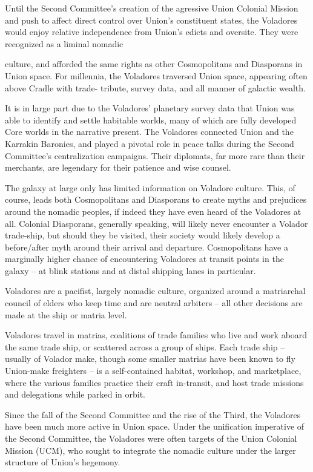 Until the Second Committee’s creation of the agressive Union Colonial Mission and push to
affect direct control over Union’s constituent states, the Voladores would enjoy relative
independence from Union’s edicts and oversite. They were recognized as a liminal nomadic




culture, and afforded the same rights as other Cosmopolitans and Diasporans in Union space.
For millennia, the Voladores traversed Union space, appearing often above Cradle with trade-
tribute, survey data, and all manner of galactic wealth.


It is in large part due to the Voladores’ planetary survey data that Union was able to identify and
settle habitable worlds, many of which are fully developed Core worlds in the narrative present.
The Voladores connected Union and the Karrakin Baronies, and played a pivotal role in peace
talks during the Second Committee’s centralization campaigns. Their diplomats, far more rare
than their merchants, are legendary for their patience and wise counsel.


The galaxy at large only has limited information on Voladore culture. This, of course, leads both
Cosmopolitans and Diasporans to create myths and prejudices around the nomadic peoples, if
indeed they have even heard of the Voladores at all. Colonial Diasporans, generally speaking, will
likely never encounter a Volador trade-ship, but should they be visited, their society would likely
develop a before/after myth around their arrival and departure. Cosmopolitans have a marginally
higher chance of encountering Voladores at transit points in the galaxy -- at blink stations and at
distal shipping lanes in particular.


Voladores are a pacifist, largely nomadic culture, organized around a matriarchal council of elders
who keep time and are neutral arbiters -- all other decisions are made at the ship or matria level.


Voladores travel in matrias, coalitions of trade families who live and work aboard the same trade
ship, or scattered across a group of ships. Each trade ship -- usually of Volador make, though
some smaller matrias have been known to fly Union-make freighters -- is a self-contained
habitat, workshop, and marketplace, where the various families practice their craft in-transit, and
host trade missions and delegations while parked in orbit.


Since the fall of the Second Committee and the rise of the Third, the Voladores have been much
more active in Union space. Under the unification imperative of the Second Committee, the
Voladores were often targets of the Union Colonial Mission (UCM), who sought to integrate the
nomadic culture under the larger structure of Union’s hegemony.


